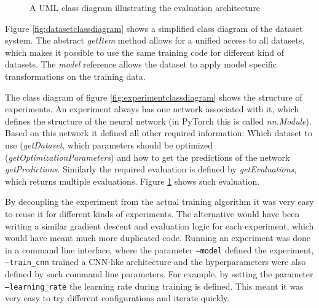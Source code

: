 \documentclass[draft,final,oneside]{vutinfth} %
\begin{document}
\begin{figure}
	\centering
{}
	\caption{A UML class diagram illustrating the evaluation architecture}
	\label{fig:evaluationclassdiagram}
\end{figure}

Figure \ref{fig:datasetclassdiagram} shows a simplified class diagram of the dataset system. The abstract \textit{getItem} method allows for a unified access to all datasets, which makes it possible to use the same training code for different kind of datasets. The \textit{model} reference allows the dataset to apply model specific transformations on the training data.

The class diagram of figure \ref{fig:experimentclassdiagram} shows the structure of experiments. An experiment always has one network associated with it, which defines the structure of the neural network (in PyTorch this is called \textit{nn.Module}). Based on this network it defined all other required information: Which dataset to use (\textit{getDataset}, which parameters should be optimized (\textit{getOptimizationParameters}) and how to get the predictions of the network \textit{getPredictions}. Similarly the required evaluation is defined by \textit{getEvaluations}, which returns multiple evaluations. Figure \ref{fig:evaluationclassdiagram} shows such evaluation.

By decoupling the experiment from the actual training algorithm it was very easy to reuse it for different kinds of experiments. The alternative would have been writing a similar gradient descent and evaluation logic for each experiment, which would have meant much more duplicated code. Running an experiment was done in a command line interface, where the parameter \texttt{--model} defined the experiment, \texttt{--train\_cnn} trained a CNN-like architecture and the hyperparameters were also defined by such command line parameters. For example, by setting the parameter \texttt{--learning\_rate} the learning rate during training is defined. This meant it was very easy to try different configurations and iterate quickly.
\end{document}
